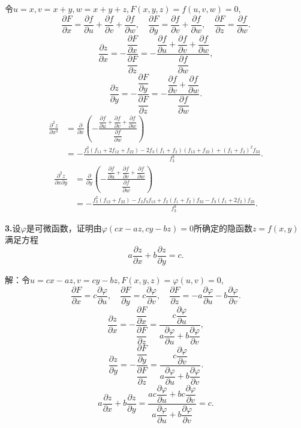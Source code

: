 \documentclass[12pt, a4paper]{article}
\begin{document}
令\(u = x, v = x + y, w = x + y + z, F(x, y, z) = f(u, v, w) = 0\),
\[\frac{\partial F}{\partial x} = \frac{\partial f}{\partial u} + \frac{\partial f}{\partial v} + \frac{\partial f}{\partial w}, \quad \frac{\partial F}{\partial y} = \frac{\partial f}{\partial v} + \frac{\partial f}{\partial w}, \quad \frac{\partial F}{\partial z} = \frac{\partial f}{\partial w}.\]
\[\frac{\partial z}{\partial x} = -\frac{\dfrac{\partial F}{\partial x}}{\dfrac{\partial F}{\partial z}} = -\frac{\dfrac{\partial f}{\partial u} + \dfrac{\partial f}{\partial v} + \dfrac{\partial f}{\partial w}}{\dfrac{\partial f}{\partial w}},\]
\[\frac{\partial z}{\partial y} = -\frac{\dfrac{\partial F}{\partial y}}{\dfrac{\partial F}{\partial z}} = -\frac{\dfrac{\partial f}{\partial v} + \dfrac{\partial f}{\partial w}}{\dfrac{\partial f}{\partial w}}.\]
\begin{align*}
\frac{\partial^2 z}{\partial x^2} &= \frac{\partial}{\partial x} \left( -\frac{\dfrac{\partial f}{\partial u} + \dfrac{\partial f}{\partial v} + \dfrac{\partial f}{\partial w}}{\dfrac{\partial f}{\partial w}} \right) \\
&= -\frac{f_3^2(f_{11} + 2f_{12} + f_{22}) - 2f_3(f_1 + f_2)(f_{13} + f_{23}) + (f_1 + f_2)^2f_{33}}{f_3^3}.
\end{align*}
\begin{align*}
\frac{\partial^2 z}{\partial x \partial y} &= \frac{\partial}{\partial y} \left( -\frac{\dfrac{\partial f}{\partial u} + \dfrac{\partial f}{\partial v} + \dfrac{\partial f}{\partial w}}{\dfrac{\partial f}{\partial w}} \right) \\
&= -\frac{f_3^2(f_{12} + f_{22}) - f_2f_3f_{13} + f_2(f_1 + f_2)f_{33} - f_3(f_1 + 2f_2)f_{23}}{f_3^3}.
\end{align*}

\textbf{3.}设\(\varphi\)是可微函数，证明由\(\varphi(cx - az, cy - bz) = 0\)所确定的隐函数\(z = f(x, y)\)满足方程
\[a\frac{\partial z}{\partial x} + b\frac{\partial z}{\partial y} = c.\]

解：令\(u = cx - az, v = cy - bz, F(x, y, z) = \varphi(u, v) = 0\),
\[\frac{\partial F}{\partial x} = c\frac{\partial \varphi}{\partial u}, \quad \frac{\partial F}{\partial y} = c\frac{\partial \varphi}{\partial v}, \quad \frac{\partial F}{\partial z} = -a\frac{\partial \varphi}{\partial u} - b\frac{\partial \varphi}{\partial v}.\]
\[\frac{\partial z}{\partial x} = -\frac{\dfrac{\partial F}{\partial x}}{\dfrac{\partial F}{\partial z}} = \frac{c\dfrac{\partial \varphi}{\partial u}}{a\dfrac{\partial \varphi}{\partial u} + b\dfrac{\partial \varphi}{\partial v}},\]
\[\frac{\partial z}{\partial y} = -\frac{\dfrac{\partial F}{\partial y}}{\dfrac{\partial F}{\partial z}} = \frac{c\dfrac{\partial \varphi}{\partial v}}{a\dfrac{\partial \varphi}{\partial u} + b\dfrac{\partial \varphi}{\partial v}}.\]
\[a\frac{\partial z}{\partial x} + b\frac{\partial z}{\partial y} = \frac{ac\dfrac{\partial \varphi}{\partial u} + bc\dfrac{\partial \varphi}{\partial v}}{a\dfrac{\partial \varphi}{\partial u} + b\dfrac{\partial \varphi}{\partial v}} = c.\]
\end{document}
